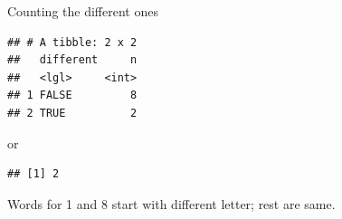 \documentclass[
  ignorenonframetext,
]{beamer}
\newenvironment{Shaded}{\begin{snugshade}}{\end{snugshade}}
\newcommand{\DataTypeTok}[1]{\textcolor[rgb]{0.13,0.29,0.53}{#1}}
\newcommand{\KeywordTok}[1]{\textcolor[rgb]{0.13,0.29,0.53}{\textbf{#1}}}
\newcommand{\NormalTok}[1]{#1}
\newcommand{\OperatorTok}[1]{\textcolor[rgb]{0.81,0.36,0.00}{\textbf{#1}}}
\newcommand{\StringTok}[1]{\textcolor[rgb]{0.31,0.60,0.02}{#1}}
\begin{document}
\begin{frame}[fragile]{Counting the different ones}
\protect\hypertarget{counting-the-different-ones}{}

\small

\begin{Shaded}
\end{Shaded}

\begin{verbatim}
## # A tibble: 2 x 2
##   different     n
##   <lgl>     <int>
## 1 FALSE         8
## 2 TRUE          2
\end{verbatim}

\normalsize

or

\small

\begin{Shaded}
\end{Shaded}

\begin{verbatim}
## [1] 2
\end{verbatim}

\normalsize

Words for 1 and 8 start with different letter; rest are same.

\end{frame}
\end{document}
